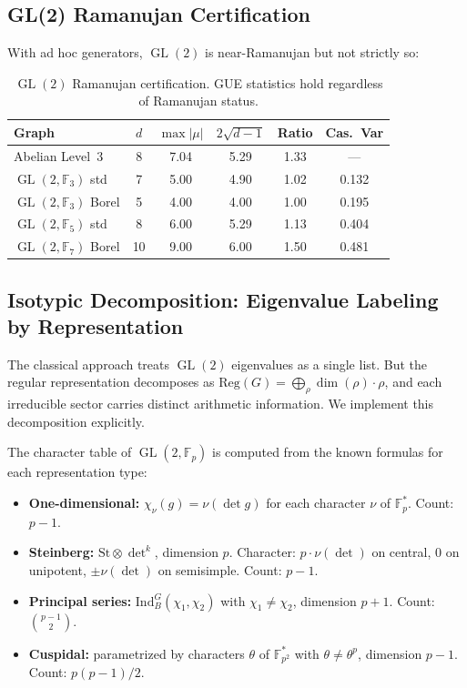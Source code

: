 \documentclass[12pt,reqno]{amsart}
\theoremstyle{plain}
\theoremstyle{definition}
\theoremstyle{remark}
\DeclareMathOperator{\GL}{GL}
\newcommand{\FF}{\mathbb{F}}
\begin{document}
\subsection{GL(2) Ramanujan Certification}

With ad hoc generators, $\GL(2)$ is near-Ramanujan but not strictly
so:

\begin{table}[h]
\centering
\begin{tabular}{lccccc}
  \toprule
  Graph & $d$ & $\max|\mu|$ & $2\sqrt{d-1}$ & Ratio & Cas.\ Var \\
  \midrule
  Abelian Level~3         & 8  & 7.04 & 5.29 & 1.33 & --- \\
  $\GL(2,\FF_3)$ std      & 7  & 5.00 & 4.90 & 1.02 & 0.132 \\
  $\GL(2,\FF_3)$ Borel    & 5  & 4.00 & 4.00 & 1.00 & 0.195 \\
  $\GL(2,\FF_5)$ std      & 8  & 6.00 & 5.29 & 1.13 & 0.404 \\
  $\GL(2,\FF_7)$ Borel    & 10 & 9.00 & 6.00 & 1.50 & 0.481 \\
  \bottomrule
\end{tabular}
\caption{$\GL(2)$ Ramanujan certification.  GUE statistics hold
  regardless of Ramanujan status.}
\label{tab:gl2_ram}
\end{table}

\subsection{Isotypic Decomposition: Eigenvalue Labeling by
  Representation}
\label{sec:isotypic}

The classical approach treats $\GL(2)$ eigenvalues as a single
list.  But the regular representation decomposes as
$\mathrm{Reg}(G) = \bigoplus_\rho \dim(\rho) \cdot \rho$, and each
irreducible sector carries distinct arithmetic information.  We
implement this decomposition explicitly.

The character table of $\GL(2, \FF_p)$ is computed from the known
formulas for each representation type:
\begin{itemize}[nosep]
  \item \textbf{One-dimensional:} $\chi_\nu(g) = \nu(\det g)$ for
    each character $\nu$ of $\FF_p^*$.  Count: $p-1$.
  \item \textbf{Steinberg:} $\mathrm{St} \otimes \det^k$, dimension
    $p$.  Character: $p \cdot \nu(\det)$ on central, $0$ on
    unipotent, $\pm \nu(\det)$ on semisimple.  Count: $p-1$.
  \item \textbf{Principal series:} $\mathrm{Ind}_B^G(\chi_1,
    \chi_2)$ with $\chi_1 \neq \chi_2$, dimension $p+1$.  Count:
    $\binom{p-1}{2}$.
  \item \textbf{Cuspidal:} parametrized by characters
    $\theta$ of $\FF_{p^2}^*$ with $\theta \neq \theta^p$,
    dimension $p-1$.  Count: $p(p-1)/2$.
\end{itemize}
\end{document}
